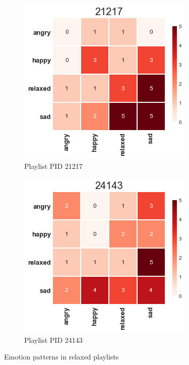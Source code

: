 \begin{figure}[H]
  \centering
  \begin{subfigure}[b]{0.49\linewidth}
    \includegraphics[width=\linewidth]{./chapters/chapter5/images/21217.png}
    \caption{Playlist PID 21217}
  \end{subfigure}
  \begin{subfigure}[b]{0.49\linewidth}
   \includegraphics[width=\linewidth]{./chapters/chapter5/images/24143.png}
    \caption{Playlist PID 24143}
  \end{subfigure}
  \caption{Emotion patterns in relaxed playlists}
  \label{fig:pattern3}
\end{figure}

